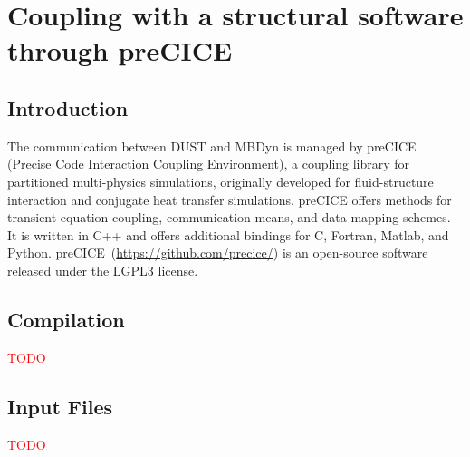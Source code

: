 \chapter{Coupling with a structural software through preCICE}
\section{Introduction}
The communication between DUST and MBDyn is managed by preCICE (Precise Code Interaction Coupling Environment), a coupling library for partitioned multi-physics simulations, originally developed for fluid-structure interaction and conjugate heat transfer simulations.
preCICE offers methods for transient equation coupling, communication means, and data mapping schemes. It is written in C++ and offers additional bindings for C, Fortran, Matlab, and Python.
preCICE~(\url{https://github.com/precice/}) is an open-source software released under the LGPL3 license. 

\section{Compilation}
\textcolor{red}{TODO}
\section{Input Files}
\textcolor{red}{TODO}

